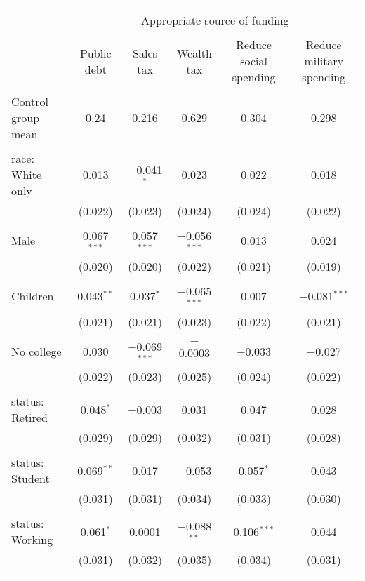 
\begin{tabular}{@{\extracolsep{5pt}}lccccc} 
\\[-1.8ex]\hline 
\hline \\[-1.8ex] 
 & \multicolumn{5}{c}{Appropriate source of funding} \\ 
\cline{2-6} 
\\[-1.8ex] & Public debt & Sales tax & Wealth tax & Reduce social spending & Reduce military spending \\ 
\hline \\[-1.8ex] 
 Control group mean & 0.24 & 0.216 & 0.629 & 0.304 & 0.298  \\ \hline \\[-1.8ex] race: White only & 0.013 & $-$0.041$^{*}$ & 0.023 & 0.022 & 0.018 \\ 
  & (0.022) & (0.023) & (0.024) & (0.024) & (0.022) \\ 
  & & & & & \\ 
 Male & 0.067$^{***}$ & 0.057$^{***}$ & $-$0.056$^{***}$ & 0.013 & 0.024 \\ 
  & (0.020) & (0.020) & (0.022) & (0.021) & (0.019) \\ 
  & & & & & \\ 
 Children & 0.043$^{**}$ & 0.037$^{*}$ & $-$0.065$^{***}$ & 0.007 & $-$0.081$^{***}$ \\ 
  & (0.021) & (0.021) & (0.023) & (0.022) & (0.021) \\ 
  & & & & & \\ 
 No college & 0.030 & $-$0.069$^{***}$ & $-$0.0003 & $-$0.033 & $-$0.027 \\ 
  & (0.022) & (0.023) & (0.025) & (0.024) & (0.022) \\ 
  & & & & & \\ 
 status: Retired & 0.048$^{*}$ & $-$0.003 & 0.031 & 0.047 & 0.028 \\ 
  & (0.029) & (0.029) & (0.032) & (0.031) & (0.028) \\ 
  & & & & & \\ 
 status: Student & 0.069$^{**}$ & 0.017 & $-$0.053 & 0.057$^{*}$ & 0.043 \\ 
  & (0.031) & (0.031) & (0.034) & (0.033) & (0.030) \\ 
  & & & & & \\ 
 status: Working & 0.061$^{*}$ & 0.0001 & $-$0.088$^{**}$ & 0.106$^{***}$ & 0.044 \\ 
  & (0.031) & (0.032) & (0.035) & (0.034) & (0.031) \\ 
  & & & & & \\ 

\end{tabular}
